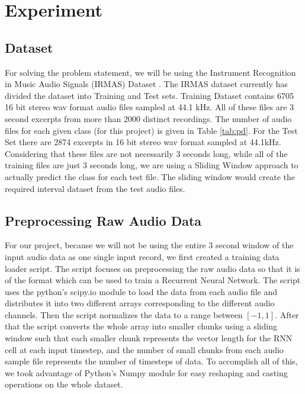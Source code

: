 \documentclass[letterpaper, 12 pt, conference]{ieeeconf}  %
\begin{document}
\section{\textbf{Experiment}}

\subsection{Dataset}

For solving the problem statement, we will be using the Instrument Recognition in Music Audio Signals (IRMAS) Dataset \cite{IRMAS_Dataset}. The IRMAS dataset currently has divided the dataset into Training and Test sets. Training Dataset contains 6705 16 bit stereo wav format audio files sampled at 44.1 kHz. All of these files are 3 second excerpts from more than 2000 distinct recordings. The number of audio files for each given class (for this project) is given in Table \ref{tab:pd}. For the Test Set there are 2874 excerpts in 16 bit stereo wav format sampled at 44.1kHz. Considering that these files are not necessarily 3 seconds long, while all of the training files are just 3 seconds long, we are using a Sliding Window approach to actually predict the class for each test file. The sliding window would create the required interval dataset from the test audio files. 

\subsection{Preprocessing Raw Audio Data}
For our project, because we will not be using the entire 3 second window of the input audio data as one single input record, we first created a training data loader script. The script focuses on preprocessing the raw audio data so that it is of the format which can be used to train a Recurrent Neural Network. The script uses the python's scipy.io module to load the data from each audio file and distributes it into two different arrays corresponding to the different audio channels. Then the script normalizes the data to a range between $[-1, 1]$. After that the script converts the whole array into smaller chunks using a sliding window such that each smaller chunk represents the vector length for the RNN cell at each input timestep, and the number of small chunks from each audio sample file represents the number of timesteps of data. To accomplish all of this, we took advantage of Python's Numpy module for easy reshaping and casting operations on the whole dataset.
\end{document}
